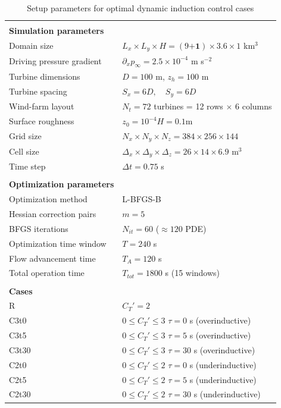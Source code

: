 \begin{table}[t]	
	\caption{Setup parameters for optimal dynamic induction control cases}\label{tab:setup_params_ind}
	\centering
	\begin{tabular}{ll}
		\hline \\
		\textbf{Simulation parameters} & \\
		Domain size  & 			$L_x \times L_y \times H = (9 \boldsymbol{+1}) \times 3.6 \times 1$ km$^3$  \\ 
		Driving pressure gradient  & 	$ \partial_x p_\infty = 2.5 \times 10^{-4}$ m s$^{-2}$  \\ 
		Turbine dimensions  &  $D = 100$ m, \quad $z_h = 100$ m\\ 
		Turbine spacing  &  $S_x = 6D, \quad S_y = 6D$\\
		Wind-farm layout & $N_t = 72 $ turbines = 12 rows $\times$ 6 columns \\ 
		Surface roughness  &  $z_0 = 10^{-4}H = 0.1$m\\ 
		Grid size & $N_x \times N_y \times N_z = 384 \times 256 \times 144$\\
		Cell size & $\Delta_x \times \Delta_y \times \Delta_z = 26 \times 14 \times 6.9$ m$^3$\\
		Time step & $\Delta t = 0.75$ s\\		
		&\\
		\textbf{Optimization parameters} & \\ 
		Optimization method			& L-BFGS-B \\
		Hessian correction pairs 	& $m = 5$ \\
		BFGS iterations 			& $N_{it} = 60$ ($\approx 120$ PDE) \\
		Optimization time window					& $T = 240$ s\\
		Flow advancement time & $T_A = 120$ s\\
		Total operation time         & $T_{tot} = 1800$ s (15 windows)\\
		&\\
		\textbf{Cases} & \\
		R			& $C_T' = 2$\\
		C3t0		& $0 \leq C_T' \leq 3$  \quad   $\tau = 0$ s (overinductive)\\
		C3t5		& $0 \leq C_T' \leq 3$  \quad   $\tau = 5$ s (overinductive)\\
		C3t30		& $0 \leq C_T' \leq 3$  \quad   $\tau = 30$ s (overinductive)\\
		C2t0		& $0 \leq C_T' \leq 2$  \quad   $\tau = 0$ s (underinductive)\\			C2t5		& $0 \leq C_T' \leq 2$  \quad   $\tau = 5$ s (underinductive)\\
		C2t30		& $0 \leq C_T' \leq 2$  \quad   $\tau = 30$ s (underinductive)\\		
		\hline 
	\end{tabular} 
\end{table}

